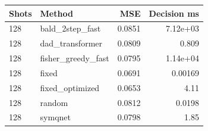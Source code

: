 \begin{tabular}{llrr}
\toprule
Shots & Method & MSE & Decision ms \\
\midrule
128 & bald\_2step\_fast & 0.0851 & 7.12e+03 \\
128 & dad\_transformer & 0.0809 & 0.809 \\
128 & fisher\_greedy\_fast & 0.0795 & 1.14e+04 \\
128 & fixed & 0.0691 & 0.00169 \\
128 & fixed\_optimized & 0.0653 & 4.11 \\
128 & random & 0.0812 & 0.0198 \\
128 & symqnet & 0.0798 & 1.85 \\
\bottomrule
\end{tabular}
